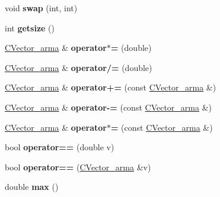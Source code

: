 \begin{DoxyCompactItemize}
void {\bfseries swap} (int, int)
\item 
\mbox{\label{class_c_vector__arma_a7fe522c22972c82087b145c3de230f04}} 
int {\bfseries getsize} ()
\item 
\mbox{\label{class_c_vector__arma_a7e3758cb133486f5ccb09d9533b21b1b}} 
\hyperlink{class_c_vector__arma}{C\+Vector\+\_\+arma} \& {\bfseries operator$\ast$=} (double)
\item 
\mbox{\label{class_c_vector__arma_a283527bdb1ada395c984daf3bbad22ab}} 
\hyperlink{class_c_vector__arma}{C\+Vector\+\_\+arma} \& {\bfseries operator/=} (double)
\item 
\mbox{\label{class_c_vector__arma_a46aeacd0255d67f12575bb3828b42040}} 
\hyperlink{class_c_vector__arma}{C\+Vector\+\_\+arma} \& {\bfseries operator+=} (const \hyperlink{class_c_vector__arma}{C\+Vector\+\_\+arma} \&)
\item 
\mbox{\label{class_c_vector__arma_ab82ad925c84770eb28e54bdbc6212673}} 
\hyperlink{class_c_vector__arma}{C\+Vector\+\_\+arma} \& {\bfseries operator-\/=} (const \hyperlink{class_c_vector__arma}{C\+Vector\+\_\+arma} \&)
\item 
\mbox{\label{class_c_vector__arma_a76c30753b447f4fd7cc6e1d9bedd3800}} 
\hyperlink{class_c_vector__arma}{C\+Vector\+\_\+arma} \& {\bfseries operator$\ast$=} (const \hyperlink{class_c_vector__arma}{C\+Vector\+\_\+arma} \&)
\item 
\mbox{\label{class_c_vector__arma_a9d7b7d5809b64cde19f2baa4dfe6fd46}} 
bool {\bfseries operator==} (double v)
\item 
\mbox{\label{class_c_vector__arma_a6ed1cb88db9c6734781a01948d46f042}} 
bool {\bfseries operator==} (\hyperlink{class_c_vector__arma}{C\+Vector\+\_\+arma} \&v)
\item 
\mbox{\label{class_c_vector__arma_adb081cf643cce939436543ea478d27ca}} 
double {\bfseries max} ()
\item 
\mbox{\label{class_c_vector__arma_aa61a727c7fa0853a4d296dedbc9c0617}} 

\end{DoxyCompactItemize}
